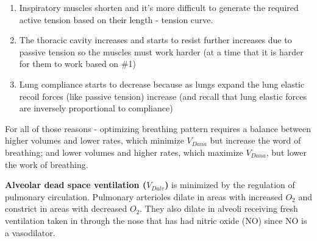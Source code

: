 \begin{enumerate}
    \item Inspiratory muscles shorten and it's more difficult to generate the required active tension based on their length - tension curve.
    \item The thoracic cavity increases and starts to resist further increases due to passive tension so the muscles must work harder (at a time that it is harder for them to work based on \#1)
    \item Lung compliance starts to decrease because as lungs expand the lung elastic recoil forces (like passive tension) increase (and recall that lung elastic forces are inversely proportional to compliance)
\end{enumerate}

For all of those reasons - optimizing breathing pattern requires a balance between higher volumes and lower rates, which minimize $V_{Dana}$ but increase the word of breathing; and lower volumes and higher rates, which maximize $V_{Dana}$, but lower the work of breathing.

\textbf{Alveolar dead space ventilation ($V_{Dalv}$)} is minimized by the regulation of pulmonary circulation. Pulmonary arterioles dilate in areas with increased $O_2$ and constrict in areas with decreased $O_2$. They also dilate in alveoli receiving fresh ventilation taken in through the nose that has had nitric oxide (NO) since NO is a vasodilator.

